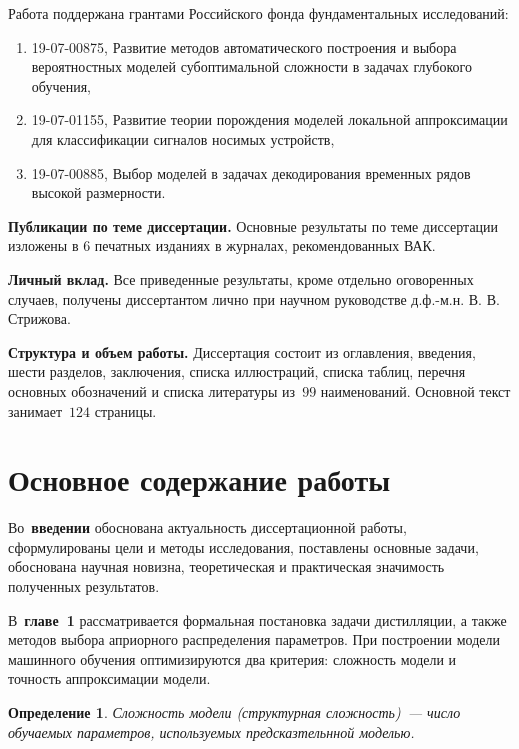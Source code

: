 \documentclass{dissert}
\newtheorem{definition}{Определение}
\begin{document}
Работа поддержана грантами Российского фонда фундаментальных исследований:

\begin{enumerate}
    \item[1)] 19-07-00875, Развитие методов автоматического построения и выбора вероятностных моделей субоптимальной сложности в задачах глубокого обучения,
    \item[2)] 19-07-01155, Развитие теории порождения моделей локальной аппроксимации для классификации сигналов носимых устройств,
    \item[3)] 19-07-00885, Выбор моделей в задачах декодирования временных рядов высокой размерности.
\end{enumerate}

\vspace{0.5cm}
\textbf{Публикации по теме диссертации.} Основные результаты по теме диссертации изложены в 6 печатных изданиях в журналах, рекомендованных ВАК.

\vspace{0.5cm}
\textbf{Личный вклад.} Все приведенные результаты, кроме отдельно оговоренных случаев, получены диссертантом лично при научном руководстве д.ф.-м.н. В. В. Стрижова.

\vspace{0.5cm}
\textbf{Структура и объем работы.} Диссертация состоит из оглавления, введения, шести разделов, заключения, списка иллюстраций, списка таблиц, перечня основных обозначений и списка литературы из~$99$ наименований. Основной текст занимает~$124$ страницы.

\section*{Основное содержание работы}
Во~\textbf{введении} обоснована актуальность диссертационной работы, сформулированы цели и методы исследования, поставлены основные задачи, обоснована научная новизна, теоретическая и практическая значимость полученных результатов.

В~\textbf{главе~1} рассматривается формальная постановка задачи дистилляции, а также методов выбора априорного распределения параметров.
При построении модели машинного обучения оптимизируются два критерия: сложность модели и точность аппроксимации модели.
\begin{definition}
Сложность модели (структурная сложность)~--- число обучаемых параметров, используемых предсказтельнной моделью.
\end{definition}
\end{document}
